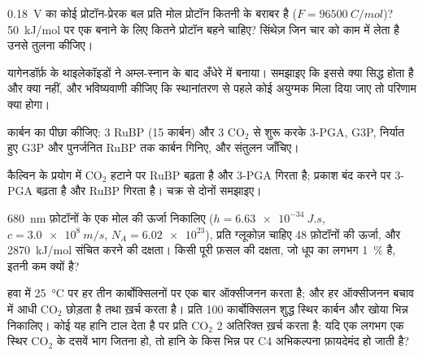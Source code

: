 \begin{exercise}[$\star\star$]\label{exo:b1:photosynthesis:6}
\qty{0.18}{V} का कोई प्रोटॉन-प्रेरक बल प्रति मोल प्रोटॉन कितनी  के बराबर है ($F = \qty{96500}{C/mol}$)? \qty{50}{kJ/mol} पर एक 
बनाने के लिए कितने प्रोटॉन बहने चाहिए? सिंथेज़ जिन चार को काम में लेता है
उनसे तुलना कीजिए।
\end{exercise}

\begin{exercise}[$\star\star$]\label{exo:b1:photosynthesis:7}
यागेनडॉर्फ़ के थाइलेकॉइडों ने अम्ल-स्नान के बाद अँधेरे में  बनाया।
समझाइए कि इससे क्या सिद्ध होता है और क्या नहीं, और भविष्यवाणी कीजिए कि
स्थानांतरण से पहले कोई अयुग्मक मिला दिया जाए तो परिणाम क्या होगा।
\end{exercise}

\begin{exercise}[$\star\star$]\label{exo:b1:photosynthesis:8}
कार्बन का पीछा कीजिए: 3 RuBP (15 कार्बन) और 3
$\mathrm{CO_2}$ से शुरू करके 3-PGA, G3P, निर्यात हुए G3P और
पुनर्जनित RuBP तक कार्बन गिनिए, और संतुलन जाँचिए।
\end{exercise}

\begin{exercise}[$\star\star$]\label{exo:b1:photosynthesis:9}
कैल्विन के प्रयोग में $\mathrm{CO_2}$ हटाने पर RuBP बढ़ता है और 3-PGA
गिरता है; प्रकाश बंद करने पर 3-PGA बढ़ता है और RuBP गिरता है।
चक्र से दोनों समझाइए।
\end{exercise}

\begin{exercise}[$\star\star\star$]\label{exo:b1:photosynthesis:10}
\qty{680}{nm} फ़ोटॉनों के एक मोल की ऊर्जा निकालिए ($h =
\qty{6.63e-34}{J.s}$, $c = \qty{3.0e8}{m/s}$, $N_A = \num{6.02e23}$),
प्रति ग्लूकोज़ चाहिए 48 फ़ोटॉनों की ऊर्जा, और \qty{2870}{kJ/mol} संचित
करने की दक्षता। किसी पूरी फ़सल की दक्षता, जो धूप का लगभग \qty{1}{\%} है,
इतनी कम क्यों है?
\end{exercise}

\begin{exercise}[$\star\star\star$]\label{exo:b1:photosynthesis:11}
हवा में \qty{25}{\celsius} पर  हर तीन कार्बोक्सिलनों पर एक बार
ऑक्सीजनन करता है; और हर ऑक्सीजनन बचाव में आधी $\mathrm{CO_2}$ छोड़ता है
तथा  ख़र्च करता है। प्रति 100
कार्बोक्सिलन शुद्ध स्थिर कार्बन और खोया भिन्न निकालिए। कोई  यह
हानि टाल देता है पर प्रति $\mathrm{CO_2}$ 2 अतिरिक्त  ख़र्च करता है:
यदि एक  लगभग एक स्थिर $\mathrm{CO_2}$ के दसवें भाग जितना हो, तो
हानि के किस भिन्न पर C4 अभिकल्पना फ़ायदेमंद हो जाती है?
\end{exercise}

